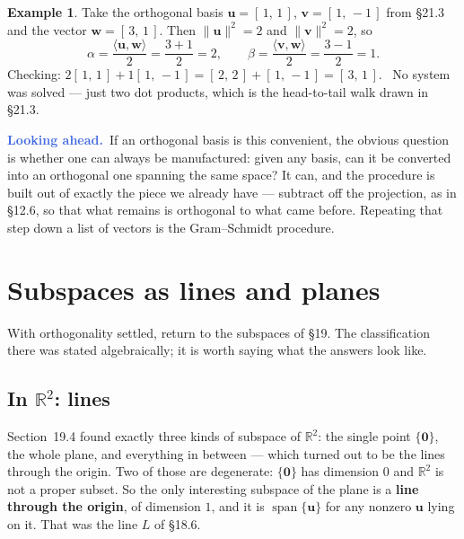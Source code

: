 \documentclass[11pt]{article}
\theoremstyle{definition}
\newtheorem{ex}{Example}[section]
\theoremstyle{remark}
\newcommand{\lookahead}{\par\smallskip\noindent
  \textbf{\sffamily\textcolor{RoyalBlue}{Looking ahead.}}\ \ignorespaces}
\newcommand{\R}{\mathbb{R}}
\newcommand{\vc}[1]{\mathbf{#1}}
\newcommand{\norm}[1]{\lVert #1\rVert}
\DeclareMathOperator{\spanop}{span}
\begin{document}
\begin{ex}
Take the orthogonal basis $\vc{u}=[\,1,\,1\,]$, $\vc{v}=[\,1,\,-1\,]$ from
\S21.3 and the vector $\vc{w}=[\,3,\,1\,]$. Then $\norm{\vc{u}}^{2}=2$ and
$\norm{\vc{v}}^{2}=2$, so
\[
  \alpha = \frac{\langle\vc{u},\vc{w}\rangle}{2} = \frac{3+1}{2} = 2,
  \qquad
  \beta  = \frac{\langle\vc{v},\vc{w}\rangle}{2} = \frac{3-1}{2} = 1 .
\]
Checking: $2[\,1,\,1\,] + 1[\,1,\,-1\,] = [\,2,\,2\,]+[\,1,\,-1\,]
= [\,3,\,1\,]$. \checkmark\ No system was solved --- just two dot products,
which is the head-to-tail walk drawn in \S21.3.
\end{ex}

\lookahead If an orthogonal basis is this convenient, the obvious question is
whether one can always be manufactured: given any basis, can it be converted
into an orthogonal one spanning the same space? It can, and the procedure is
built out of exactly the piece we already have --- subtract off the projection,
as in \S12.6, so that what remains is orthogonal to what came before. Repeating
that step down a list of vectors is the Gram--Schmidt procedure.

\section{Subspaces as lines and planes}
With orthogonality settled, return to the subspaces of \S19. The classification
there was stated algebraically; it is worth saying what the answers look like.

\subsection{In \texorpdfstring{$\R^{2}$}{R2}: lines}
Section~19.4 found exactly three kinds of subspace of $\R^{2}$: the single point
$\{\vc{0}\}$, the whole plane, and everything in between --- which turned out to
be the lines through the origin. Two of those are degenerate: $\{\vc{0}\}$ has
dimension $0$ and $\R^{2}$ is not a proper subset. So the only interesting
subspace of the plane is a \textbf{line through the origin}, of dimension $1$,
and it is $\spanop\{\vc{u}\}$ for any nonzero $\vc{u}$ lying on it. That was the
line $L$ of \S18.6.
\end{document}
